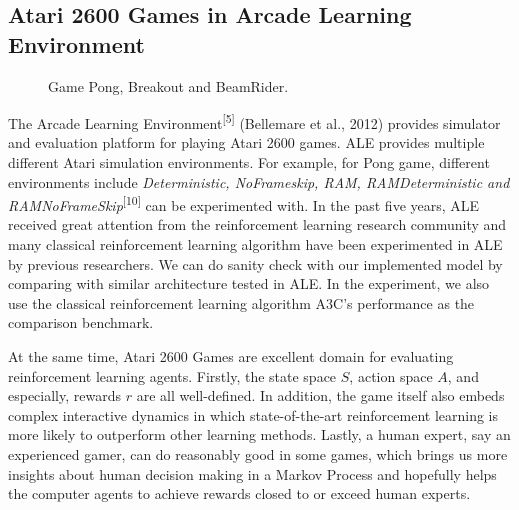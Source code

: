 \documentclass[12pt,twocolumn,letterpaper]{article}
\begin{document}
\subsection{Atari 2600 Games in Arcade Learning Environment}

\begin{figure}
\begin{center}
\end{center}
   \caption{Game Pong, Breakout and BeamRider.}
\label{fig:short}
\end{figure}

The Arcade Learning Environment\textsuperscript{[5]} (Bellemare et al., 2012) provides simulator and evaluation platform for playing Atari 2600 games. ALE provides multiple different Atari simulation environments. For example, for Pong game, different environments include \textit{Deterministic, NoFrameskip, RAM, RAMDeterministic and RAMNoFrameSkip}\textsuperscript{[10]} can be experimented with. In the past five years, ALE received great attention from the reinforcement learning research community and many classical reinforcement learning algorithm have been experimented in ALE by previous researchers. We can do sanity check with our implemented model by comparing with similar architecture tested in ALE. In the experiment, we also use the classical reinforcement learning algorithm A3C's performance as the comparison benchmark. 

At the same time, Atari 2600 Games are excellent domain for evaluating reinforcement learning agents. Firstly, the state space $S$, action space $A$, and especially, rewards $r$ are all well-defined. In addition, the game itself also embeds complex interactive dynamics in which state-of-the-art reinforcement learning is more likely to outperform other learning methods. Lastly, a human expert, say an experienced gamer, can do reasonably good in some games, which brings us more insights about human decision making in a Markov Process and hopefully helps the computer agents to achieve rewards closed to or exceed human experts.
\end{document}
